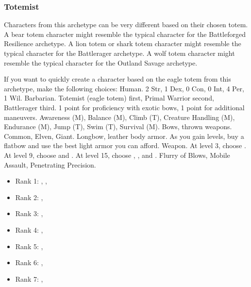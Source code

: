         \subsubsection{Totemist}
            Characters from this archetype can be very different based on their chosen totem.
            A bear totem character might resemble the typical character for the Battleforged Resilience archetype.
            A lion totem or shark totem character might resemble the typical character for the Battlerager archetype.
            A wolf totem character might resemble the typical character for the Outland Savage archetype.

            If you want to quickly create a character based on the eagle totem from this archetype, make the following choices:
             Human.
             2 Str, 1 Dex, 0 Con, 0 Int, 4 Per, 1 Wil.
             Barbarian.
             Totemist (eagle totem) first, Primal Warrior second, Battlerager third.
             1 point for proficiency with exotic bows, 1 point for additional maneuvers.
             Awareness (M), Balance (M), Climb (T), Creature Handling (M), Endurance (M), Jump (T), Swim (T), Survival (M).
             Bows, thrown weapons.
             Common, Elven, Giant.
             Longbow, leather body armor. As you gain levels, buy a flatbow and use the best light armor you can afford.
             Weapon.
                At level 3, choose .
                At level 9, choose  and .
                At level 15, choose , , and .
             Flurry of Blows, Mobile Assault, Penetrating Precision.
            \begin{itemize}
                \item Rank 1: , , 
                \item Rank 2: , 
                \item Rank 3: , 
                \item Rank 4: , 
                \item Rank 5: , 
                \item Rank 6: , 
                \item Rank 7: , 
            \end{itemize}
